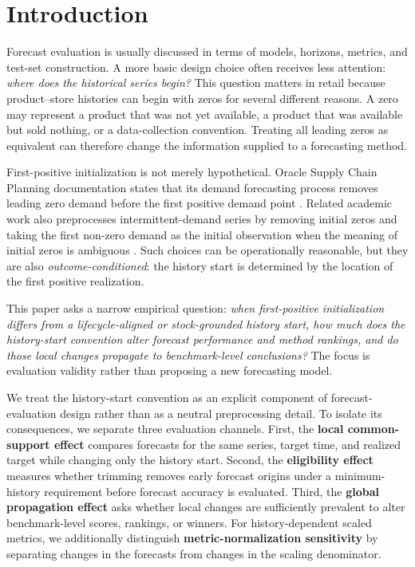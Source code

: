 \section{Introduction}

Forecast evaluation is usually discussed in terms of models, horizons, metrics, and test-set construction. A more basic design choice often receives less attention: \emph{where does the historical series begin?} This question matters in retail because product--store histories can begin with zeros for several different reasons. A zero may represent a product that was not yet available, a product that was available but sold nothing, or a data-collection convention. Treating all leading zeros as equivalent can therefore change the information supplied to a forecasting method.

First-positive initialization is not merely hypothetical. Oracle Supply Chain Planning documentation states that its demand forecasting process removes leading zero demand before the first positive demand point \citep{oracle2026leadingzeros}. Related academic work also preprocesses intermittent-demand series by removing initial zeros and taking the first non-zero demand as the initial observation when the meaning of initial zeros is ambiguous \citep{li2023feature}. Such choices can be operationally reasonable, but they are also \emph{outcome-conditioned}: the history start is determined by the location of the first positive realization.

This paper asks a narrow empirical question: \emph{when first-positive initialization differs from a lifecycle-aligned or stock-grounded history start, how much does the history-start convention alter forecast performance and method rankings, and do those local changes propagate to benchmark-level conclusions?} The focus is evaluation validity rather than proposing a new forecasting model.

We treat the history-start convention as an explicit component of forecast-evaluation design rather than as a neutral preprocessing detail. To isolate its consequences, we separate three evaluation channels. First, the \textbf{local common-support effect} compares forecasts for the same series, target time, and realized target while changing only the history start. Second, the \textbf{eligibility effect} measures whether trimming removes early forecast origins under a minimum-history requirement before forecast accuracy is evaluated. Third, the \textbf{global propagation effect} asks whether local changes are sufficiently prevalent to alter benchmark-level scores, rankings, or winners. For history-dependent scaled metrics, we additionally distinguish \textbf{metric-normalization sensitivity} by separating changes in the forecasts from changes in the scaling denominator.

